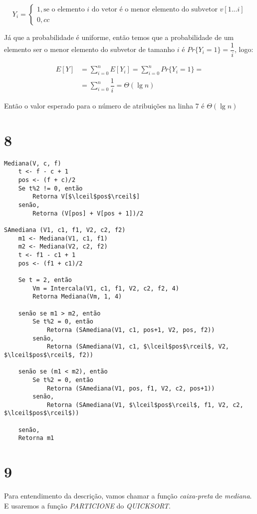 \documentclass[a4paper, 12pt]{article}
\begin{document}
$$ Y_i = 
\begin{cases}
1, \text{se o elemento $i$ do vetor é o menor elemento do subvetor $v[1...i]$}\\
0, cc
\end{cases}
$$

Já que a probabilidade é uniforme, então temos que a probabilidade de um elemento
ser o menor elemento do subvetor de tamanho $i$ é $Pr\{Y_i = 1\} = \dfrac{1}{i}$, logo:

\begin{align*}
E[Y] &= \sum_{i = 0}^{n} E[Y_i] = \sum_{i = 0}^{n} Pr\{Y_i = 1\} = \\
	 &= \sum_{i = 0}^{n} \dfrac{1}{i} = \Theta(\lg n)
\end{align*}

Então o valor esperado para o número de atribuições na linha 7 é $\Theta(\lg n)$
\section*{8}
\begin{lstlisting}[mathescape=true]
Mediana(V, c, f)
    t <- f - c + 1
    pos <- (f + c)/2
    Se t%2 != 0, então
        Retorna V[$\lceil$pos$\rceil$]
    senão,
        Retorna (V[pos] + V[pos + 1])/2

SAmediana (V1, c1, f1, V2, c2, f2)
    m1 <- Mediana(V1, c1, f1)
    m2 <- Mediana(V2, c2, f2)
    t <- f1 - c1 + 1
    pos <- (f1 + c1)/2

    Se t = 2, então
        Vm = Intercala(V1, c1, f1, V2, c2, f2, 4)
        Retorna Mediana(Vm, 1, 4)

    senão se m1 > m2, então
        Se t%2 = 0, então
            Retorna (SAmediana(V1, c1, pos+1, V2, pos, f2))
        senão,
            Retorna (SAmediana(V1, c1, $\lceil$pos$\rceil$, V2, $\lceil$pos$\rceil$, f2))
    
    senão se (m1 < m2), então
        Se t%2 = 0, então
            Retorna (SAmediana(V1, pos, f1, V2, c2, pos+1))
        senão,
            Retorna (SAmediana(V1, $\lceil$pos$\rceil$, f1, V2, c2, $\lceil$pos$\rceil$))
    
    senão,
    Retorna m1

\end{lstlisting}

\section*{9}
Para entendimento da descrição, vamos chamar a função \textit{caixa-preta} de
\textit{mediana}. E usaremos a função \textit{PARTICIONE} do \textit{QUICKSORT}.
\end{document}
